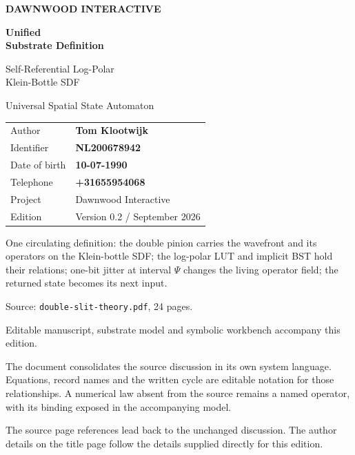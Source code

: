 \documentclass[11pt,a4paper]{article}
\newcommand{\code}[1]{\texttt{#1}}
\newcommand{\Klein}{\mathcal{K}}
\begin{document}
\begin{titlepage}
\vspace*{8mm}
{\sffamily\bfseries\color{DWGreen}\Large DAWNWOOD INTERACTIVE}\par
\vspace{6mm}{\color{DWGold}\rule{48mm}{1.4pt}}\par
\vspace{17mm}
{\sffamily\bfseries\fontsize{32}{37}\selectfont Unified\\Substrate Definition}\par
\vspace{9mm}
{\sffamily\fontsize{17}{22}\selectfont Self-Referential Log-Polar\\Klein-Bottle SDF}\par
\vspace{5mm}
{\sffamily\color{DWGreen}\large Universal Spatial State Automaton}\par
\vspace{18mm}
\begin{tabular}{@{}ll@{}}
\textsf{Author} & \textbf{Tom Klootwijk}\\[7pt]
\textsf{Identifier} & \textbf{NL200678942}\\[7pt]
\textsf{Date of birth} & \textbf{10-07-1990}\\[7pt]
\textsf{Telephone} & \textbf{+31655954068}\\[7pt]
\textsf{Project} & Dawnwood Interactive\\[7pt]
\textsf{Edition} & Version 0.2 \enspace / \enspace 16 September 2026
\end{tabular}
\vfill
\begin{dwbox}
One circulating definition: the double pinion carries the wavefront and its operators on the Klein-bottle SDF; the log-polar LUT and implicit BST hold their relations; one-bit jitter at interval $\Psi$ changes the living operator field; the returned state becomes its next input.
\end{dwbox}
\vspace{5mm}
{\sffamily\small\color{DWGray}Source: \code{double-slit-theory.pdf}, 24 pages.\par
Editable manuscript, substrate model and symbolic workbench accompany this edition.}
\end{titlepage}
\setcounter{page}{2}
\tableofcontents
\vfill
\begin{dwbox}
The document consolidates the source discussion in its own system language. Equations, record names and the written cycle are editable notation for those relationships. A numerical law absent from the source remains a named operator, with its binding exposed in the accompanying model.

The source page references lead back to the unchanged discussion. The author details on the title page follow the details supplied directly for this edition.
\end{dwbox}
\clearpage
\end{document}
